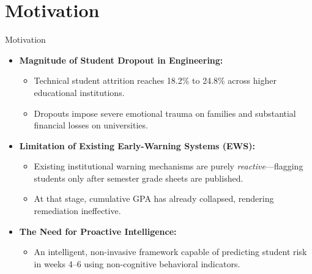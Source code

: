 \documentclass{beamer}
\begin{document}
\section{Motivation}

\begin{frame}{Motivation}
  \begin{itemize}\setlength{\itemsep}{9pt}
    \item \textbf{Magnitude of Student Dropout in Engineering:}
    \begin{itemize}\setlength{\itemsep}{4pt}
      \item Technical student attrition reaches 18.2\% to 24.8\% across higher educational institutions.
      \item Dropouts impose severe emotional trauma on families and substantial financial losses on universities.
    \end{itemize}
    
    \item \textbf{Limitation of Existing Early-Warning Systems (EWS):}
    \begin{itemize}\setlength{\itemsep}{4pt}
      \item Existing institutional warning mechanisms are purely \textit{reactive}—flagging students only after semester grade sheets are published.
      \item At that stage, cumulative GPA has already collapsed, rendering remediation ineffective.
    \end{itemize}
    
    \item \textbf{The Need for Proactive Intelligence:}
    \begin{itemize}\setlength{\itemsep}{4pt}
      \item An intelligent, non-invasive framework capable of predicting student risk in weeks 4--6 using non-cognitive behavioral indicators.
    \end{itemize}
  \end{itemize}
\end{frame}
\end{document}
